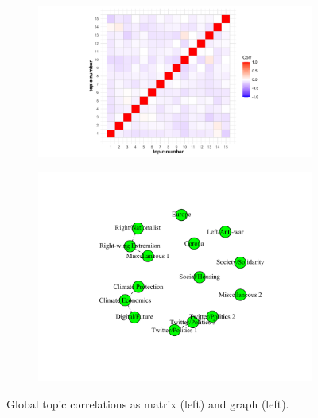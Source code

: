 \begin{figure}[h!]
  \centering
  \captionsetup{justification=centering,margin=2cm}
  \begin{subfigure}[b]{0.4\linewidth}
    \includegraphics[width=\linewidth]{../plots/4_3/topic_correlations.pdf}
  \end{subfigure}
  \begin{subfigure}[b]{0.4\linewidth}
    \includegraphics[width=\linewidth]{../plots/4_3/topic_correlations_map.pdf}
  \end{subfigure}
  \caption{Global topic correlations as matrix (left) and graph (left).}
  \label{fig:topic_correlations}
\end{figure}